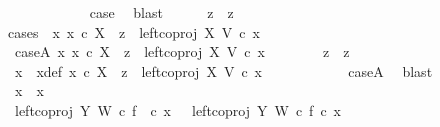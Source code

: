 \begin{isabellebody}
\ \ \ \ \ \ \ \ \ \ \isamarkupfalse%
\ case{}\ \isamarkupfalse%
\ blast\isanewline
\ \ \ \ \isamarkupfalse%
\ {\isachardoublequoteopen}z{}\ {\isacharequal}{\kern0pt}\ z{}{\isachardoublequoteclose}\isanewline
\ \ \ \ \isamarkupfalse%
{\isacharparenleft}{\kern0pt}cases\ {\isachardoublequoteopen}{\isasymexists}\ x{}{\isachardot}{\kern0pt}\ x{}\ {\isasymin}\isactrlsub c\ X\ {\isasymand}\ z{}\ {\isacharequal}{\kern0pt}\ left{\isacharunderscore}{\kern0pt}coproj\ X\ V\ {\isasymcirc}\isactrlsub c\ x{}{\isachardoublequoteclose}{\isacharparenright}{\kern0pt}\isanewline
\ \ \ \ \ \ \isamarkupfalse%
\ caseA{\isacharcolon}{\kern0pt}\ {\isachardoublequoteopen}{\isasymexists}x{}{\isachardot}{\kern0pt}\ x{}\ {\isasymin}\isactrlsub c\ X\ {\isasymand}\ z{}\ {\isacharequal}{\kern0pt}\ left{\isacharunderscore}{\kern0pt}coproj\ X\ V\ {\isasymcirc}\isactrlsub c\ x{}{\isachardoublequoteclose}\isanewline
\ \ \ \ \ \ \isamarkupfalse%
\ {\isachardoublequoteopen}z{}\ {\isacharequal}{\kern0pt}\ z{}{\isachardoublequoteclose}\isanewline
\ \ \ \ \ \ \isamarkupfalse%
\ {\isacharminus}{\kern0pt}\ \isanewline
\ \ \ \ \ \ \ \ \isamarkupfalse%
\ x{}\ \ x{}{\isacharunderscore}{\kern0pt}def{\isacharcolon}{\kern0pt}\ {\isachardoublequoteopen}x{}\ {\isasymin}\isactrlsub c\ X\ {\isasymand}\ z{}\ {\isacharequal}{\kern0pt}\ left{\isacharunderscore}{\kern0pt}coproj\ X\ V\ {\isasymcirc}\isactrlsub c\ x{}{\isachardoublequoteclose}\isanewline
\ \ \ \ \ \ \ \ \ \ \isamarkupfalse%
\ caseA\ \isamarkupfalse%
\ blast\isanewline
\ \ \ \ \ \ \ \ \isamarkupfalse%
\ {\isachardoublequoteopen}x{}\ {\isacharequal}{\kern0pt}\ x{}{\isachardoublequoteclose}\isanewline
\ \ \ \ \ \ \ \ \isamarkupfalse%
\ {\isacharminus}{\kern0pt}\ \isanewline
\ \ \ \ \ \ \ \ \ \ \isamarkupfalse%
\ {\isachardoublequoteopen}left{\isacharunderscore}{\kern0pt}coproj\ Y\ W\ {\isasymcirc}\isactrlsub c\ f\ \ {\isasymcirc}\isactrlsub c\ x{}\ \ {\isacharequal}{\kern0pt}\ {\isacharparenleft}{\kern0pt}left{\isacharunderscore}{\kern0pt}coproj\ Y\ W\ {\isasymcirc}\isactrlsub c\ f{\isacharparenright}{\kern0pt}\ {\isasymcirc}\isactrlsub c\ x{}{\isachardoublequoteclose}\isanewline

\end{isabellebody}
